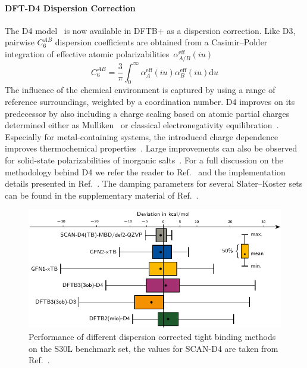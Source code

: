 \documentclass[reprint,onecolumn,superscriptaddress]{revtex4-1}
\newcommand{\dftbp}{DFTB+}
\begin{document}
\paragraph{DFT-D4 Dispersion Correction}
The D4 model~\cite{caldeweyher2017,caldeweyher2019} is now available in \dftbp{} as
a dispersion correction. Like D3, pairwise $C_6^{AB}$ dispersion coefficients
are obtained from a Casimir--Polder integration of effective atomic
polarizabilities~$\alpha_{A/B}^\text{eff}(iu)$
%
\begin{equation}
  \label{eq:casimir-polder}
  C_6^{AB} = \frac3\pi\int^\infty_0 \alpha_A^\text{eff}(iu)\alpha_B^\text{eff}(iu)
  \mathrm{d}u
\end{equation}
%
The influence of the chemical environment is captured by using a range of
reference surroundings, weighted by a coordination number.  D4 improves on its
predecessor by also including a charge scaling based on atomic partial charges
determined either as Mulliken~\cite{caldeweyher2017} or classical
electronegativity equilibration~\cite{caldeweyher2019}. Especially for
metal-containing systems, the introduced charge dependence improves
thermochemical properties~\cite{bursch2019}. Large improvements can also be
observed for solid-state polarizabilities of inorganic
salts~\cite{caldeweyher2020}. For a full discussion on the methodology behind D4
we refer the reader to Ref.~\cite{caldeweyher2019} and the implementation
details presented in Ref.~\cite{caldeweyher2020}. The damping parameters
for several Slater--Koster sets can be found in the supplementary material of
Ref.~\cite{hourahine-JCP-152-124101}.
\begin{figure}[htbp]
  \includegraphics[width=\textwidth]{figures/s30l-boxplot.pdf}
  \caption{\label{fig:d4-s30l} Performance of different dispersion corrected
    tight binding methods on the S30L benchmark set, the values for SCAN-D4 are
    taken from Ref.~\cite{caldeweyher2019}.}
\end{figure}
\end{document}
